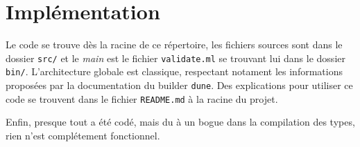 \documentclass[twoside,12pt]{article}
\begin{document}


\section{Implémentation}

Le code se trouve dès la racine de ce répertoire, les fichiers sources sont
dans le dossier \texttt{src/} et le \textit{main} est le fichier \texttt{validate.ml}
se trouvant lui dans le dossier \texttt{bin/}. L'architecture globale est
classique, respectant notament les informations proposées par la documentation
du builder \texttt{dune}.
Des explications pour utiliser ce code se trouvent dans le fichier \texttt{README.md}
à la racine du projet.

Enfin, presque tout a été codé, mais du à un bogue dans la compilation des types,
rien n'est complétement fonctionnel.

\end{document}
